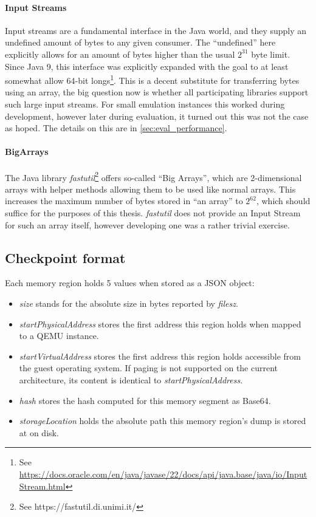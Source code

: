 \paragraph{Input Streams}
Input streams are a fundamental interface in the Java world,
and they supply an undefined amount of bytes to any given consumer.
The \enquote{undefined} here explicitly allows for an amount of bytes higher than the usual $2^{31}$ byte limit.
Since Java 9, this interface was explicitly expanded with the goal to at least somewhat allow 64-bit longs\footnote{See \href{https://docs.oracle.com/en/java/javase/22/docs/api/java.base/java/io/InputStream.html#transferTo(java.io.OutputStream)}{https://docs.oracle.com/en/java/javase/22/docs/api/java.base/java/io/InputStream.html}}.
This is a decent substitute for transferring bytes using an array,
the big question now is whether all participating libraries support such large input streams.
For small emulation instances this worked during development,
however later during evaluation, it turned out this was not the case as hoped.
The details on this are in \autoref{sec:eval_performance}.

\paragraph{BigArrays}
The Java library \emph{fastutil}\footnote{See https://fastutil.di.unimi.it/} offers so-called \enquote{Big Arrays},
which are 2-dimensional arrays with helper methods allowing them to be used like normal arrays.
This increases the maximum number of bytes stored in \enquote{an array} to $2^{62}$,
which should suffice for the purposes of this thesis.
\emph{fastutil} does not provide an Input Stream for such an array itself,
however developing one was a rather trivial exercise.

\subsection{Checkpoint format}
Each memory region holds 5 values when stored as a JSON object:
\begin{itemize}
    \item \emph{size} stands for the absolute size in bytes reported by \emph{filesz}.
    \item \emph{startPhysicalAddress} stores the first address this region holds when mapped to a QEMU instance.
    \item \emph{startVirtualAddress} stores the first address this region holds accessible from the guest operating system.
    If paging is not supported on the current architecture, its content is identical to \emph{startPhysicalAddress}.
    \item \emph{hash} stores the hash computed for this memory segment as Base64.
    \item \emph{storageLocation} holds the absolute path this memory region's dump is stored at on disk.
\end{itemize}


